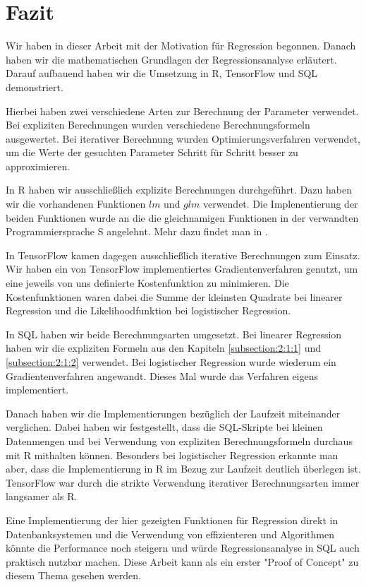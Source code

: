 \chapter{Fazit}
\label{chapter:6}

Wir haben in dieser Arbeit mit der Motivation für Regression begonnen. Danach haben wir die mathematischen Grundlagen der Regressionsanalyse erläutert. Darauf aufbauend haben wir die Umsetzung in R, TensorFlow und SQL demonstriert.

Hierbei haben zwei verschiedene Arten zur Berechnung der Parameter verwendet. Bei expliziten Berechnungen wurden verschiedene Berechnungsformeln ausgewertet. Bei iterativer Berechnung wurden Optimierungsverfahren verwendet, um die Werte der gesuchten Parameter Schritt für Schritt besser zu approximieren.

In R haben wir ausschließlich explizite Berechnungen durchgeführt. Dazu haben wir die vorhandenen Funktionen $lm$ und $glm$ verwendet. Die Implenentierung der beiden Funktionen wurde an die die gleichnamigen Funktionen in der verwandten Programmiersprache S angelehnt. Mehr dazu findet man in \cite{statistical}.

In TensorFlow kamen dagegen ausschließlich iterative Berechnungen zum Einsatz. Wir haben ein von TensorFlow implementiertes Gradientenverfahren genutzt, um eine jeweils von uns definierte Kostenfunktion zu minimieren. Die Kostenfunktionen waren dabei die Summe der kleinsten Quadrate bei linearer Regression und die Likelihoodfunktion bei logistischer Regression.

In SQL haben wir beide Berechnungsarten umgesetzt. Bei linearer Regression haben wir die expliziten Formeln aus den Kapiteln \ref{subsection:2:1:1} und \ref{subsection:2:1:2} verwendet. Bei logistischer Regression wurde wiederum ein Gradientenverfahren angewandt. Dieses Mal wurde das Verfahren eigens implementiert.

Danach haben wir die Implementierungen bezüglich der Laufzeit miteinander verglichen. Dabei haben wir festgestellt, dass die SQL-Skripte bei kleinen Datenmengen und bei Verwendung von expliziten Berechnungsformeln durchaus mit R mithalten können. Besonders bei logistischer Regression erkannte man aber, dass die Implementierung in R im Bezug zur Laufzeit deutlich überlegen ist. TensorFlow war durch die strikte Verwendung iterativer Berechnungsarten immer langsamer als R.

Eine Implementierung der hier gezeigten Funktionen für Regression direkt in Datenbanksystemen und die Verwendung von effizienteren und Algorithmen könnte die Performance noch steigern und würde Regressionsanalyse in SQL auch praktisch nutzbar machen. Diese Arbeit kann als ein erster "Proof of Concept" zu diesem Thema gesehen werden.
